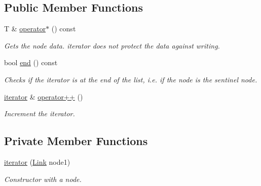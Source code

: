 \subsection*{Public Member Functions}
\begin{DoxyCompactItemize}
\item 
\hypertarget{classofeli_1_1list_1_1iterator_a4a8d4e7e15187464c623be990bf3d962}{T \& \hyperlink{classofeli_1_1list_1_1iterator_a4a8d4e7e15187464c623be990bf3d962}{operator$\ast$} () const }\label{classofeli_1_1list_1_1iterator_a4a8d4e7e15187464c623be990bf3d962}

\begin{DoxyCompactList}\small\item\em Gets the node data. {\itshape iterator} does not protect the data against writing. \end{DoxyCompactList}\item 
\hypertarget{classofeli_1_1list_1_1iterator_a687a367e3b5b94b3055e56f59b960567}{bool \hyperlink{classofeli_1_1list_1_1iterator_a687a367e3b5b94b3055e56f59b960567}{end} () const }\label{classofeli_1_1list_1_1iterator_a687a367e3b5b94b3055e56f59b960567}

\begin{DoxyCompactList}\small\item\em Checks if the iterator is at the end of the list, i.\-e. if the node is the sentinel node. \end{DoxyCompactList}\item 
\hypertarget{classofeli_1_1list_1_1iterator_a9c99a73cccabc3dd1325e1c243aca667}{\hyperlink{classofeli_1_1list_1_1iterator}{iterator} \& \hyperlink{classofeli_1_1list_1_1iterator_a9c99a73cccabc3dd1325e1c243aca667}{operator++} ()}\label{classofeli_1_1list_1_1iterator_a9c99a73cccabc3dd1325e1c243aca667}

\begin{DoxyCompactList}\small\item\em Increment the iterator. \end{DoxyCompactList}\end{DoxyCompactItemize}
\subsection*{Private Member Functions}
\begin{DoxyCompactItemize}
\item 
\hypertarget{classofeli_1_1list_1_1iterator_ac45584122cd0b4f60d046503595736b1}{\hyperlink{classofeli_1_1list_1_1iterator_ac45584122cd0b4f60d046503595736b1}{iterator} (\hyperlink{classofeli_1_1list_a7765ecb875543506d04dbd466f754503}{Link} node1)}\label{classofeli_1_1list_1_1iterator_ac45584122cd0b4f60d046503595736b1}

\begin{DoxyCompactList}\small\item\em Constructor with a node. \end{DoxyCompactList}\end{DoxyCompactItemize}
